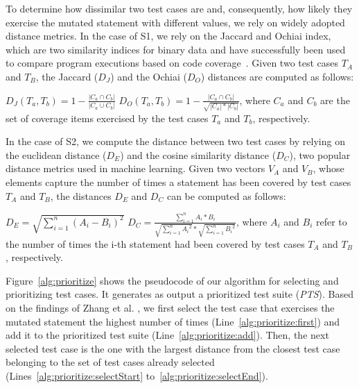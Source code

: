 To determine how dissimilar two test cases are and, consequently, how likely they exercise the mutated statement with different values, we rely on widely adopted distance metrics. 
In the case of S1, we rely on the Jaccard and Ochiai index, which are two similarity indices for binary data and have successfully been used to compare program executions based on code coverage~\cite{Zou:Ochiai:2019,Keller:Jaccard:2017,Briand:2019}. Given two test cases $T_A$ and $T_B$, the Jaccard  ($D_J$) and the Ochiai ($D_O$) distances are computed as follows:

$D_J(T_a,T_b)=1-\frac{|C_a \cap C_b|}{|C_a \cup C_b|}$ \hspace{2mm} $D_O(T_a,T_b)=1-\frac{|C_a \cap C_b|}{\sqrt{|C_a| * |C_b|}}$, 
where $C_a$ and $C_b$ are the set of coverage items exercised by the test cases $T_a$ and $T_b$, respectively.

In the case of S2, we compute the distance between two test cases by relying on the euclidean distance ($D_E$) and the cosine similarity distance ($D_C$), two popular distance metrics used in machine learning. Given two vectors $V_A$ and $V_B$, whose elements capture the number of times a statement has been covered by test cases $T_A$ and $T_B$, the distances $D_E$ and $D_C$ can be computed as follows:

$D_E=\sqrt{\sum_{i=1}^{n}(A_i-B_i)^2}$ 
$D_C= \frac{\sum_{i=1}^{n}A_i*B_i}{\sqrt{\sum_{i=1}^{n}{A_i}^2}*\sqrt{\sum_{i=1}^{n}{B_i}^2}}$,
where $A_i$ and $B_i$ refer to the number of times the i-th statement had been covered by test cases $T_A$ and $T_B$, respectively.

Figure~\ref{alg:prioritize} shows the pseudocode of our algorithm for selecting and prioritizing test cases. It generates as output
a prioritized test suite (\emph{PTS}).
Based on the findings of Zhang et al. \cite{zhang2013faster}, we first select the test case that exercises the mutated statement the highest number of times (Line~\ref{alg:prioritize:first})  { and add it to the prioritized test suite (Line~\ref{alg:prioritize:add}).}
Then, the next selected test case is the one with the largest distance from the closest test case belonging to the set of test cases already selected (Lines~\ref{alg:prioritize:selectStart} to~\ref{alg:prioritize:selectEnd}). 


